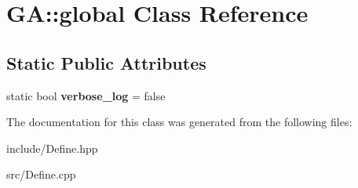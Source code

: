 \hypertarget{class_g_a_1_1global}{}\section{GA\+::global Class Reference}
\label{class_g_a_1_1global}
\subsection*{Static Public Attributes}
\begin{DoxyCompactItemize}
\item 
\mbox{\label{class_g_a_1_1global_a503304ec81b99e760c6aea73e752b9ea}} 
static bool {\bfseries verbose\+\_\+log} = false
\end{DoxyCompactItemize}


The documentation for this class was generated from the following files\+:\begin{DoxyCompactItemize}
\item 
include/Define.\+hpp\item 
src/Define.\+cpp\end{DoxyCompactItemize}
